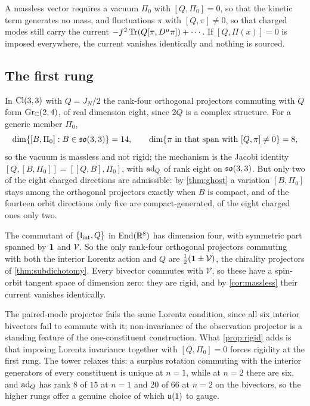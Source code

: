 \begin{corollary}
\label{cor:massless}
A massless vector requires a vacuum $\Pi_0$ with $[Q,\Pi_0]=0$, so that the kinetic term generates no mass, and fluctuations $\pi$ with $[Q,\pi]\neq0$, so that charged modes
still carry the current $-f^2\operatorname{Tr}(Q[\pi,D^\mu\pi])+\cdots$. If $[Q,\Pi(x)]=0$ is imposed everywhere, the current vanishes identically and nothing is sourced.
\end{corollary}

\subsection{The first rung}

\begin{theorem}
\label{thm:massless1}
In $\mathrm{Cl}(3,3)$ with $Q=J_N/2$ the rank-four orthogonal projectors commuting with $Q$ form $\mathrm{Gr}_{\mathbb{C}}(2,4)$, of real dimension eight, since $2Q$ is a complex structure.
For a generic member $\Pi_0$,
\[
\dim\{[B,\Pi_0]:B\in\mathfrak{so}(3,3)\}=14,\qquad \dim\{\pi\ \text{in that span with}\ [Q,\pi]\neq0\}=8,
\]
so the vacuum is massless and not rigid; the mechanism is the Jacobi identity $[Q,[B,\Pi_0]]=[[Q,B],\Pi_0]$, with $\operatorname{ad}_Q$ of rank eight on $\mathfrak{so}(3,3)$. But only two of the eight
charged directions are admissible: by \cref{thm:ghost} a variation $[B,\Pi_0]$ stays among the orthogonal projectors exactly when $B$ is compact, and of the fourteen orbit
directions only five are compact-generated, of the eight charged ones only two.
\end{theorem}

\begin{proposition}
\label{prop:rigid}
The commutant of $\{\mathfrak l_{\rm int},Q\}$ in $\operatorname{End}(\mathbb{R}^8)$ has dimension four, with symmetric part spanned by $\mathbf 1$ and $\mathcal V$. So the only rank-four orthogonal projectors commuting
with both the interior Lorentz action and $Q$ are $\tfrac12(\mathbf 1\pm\mathcal V)$, the chirality projectors of \cref{thm:subdichotomy}. Every bivector commutes with $\mathcal V$, so
these have a spin-orbit tangent space of dimension zero: they are rigid, and by \cref{cor:massless} their current vanishes identically.
\end{proposition}

The paired-mode projector fails the same Lorentz condition, since all six interior bivectors fail to commute with it; non-invariance of the observation projector
is a standing feature of the one-constituent construction. What \cref{prop:rigid} adds is that imposing Lorentz invariance together with $[Q,\Pi_0]=0$ forces rigidity
at the first rung. The tower relaxes this: a surplus rotation commuting with the interior generators of every constituent is unique at $n=1$, while at $n=2$ there are
six, and $\operatorname{ad}_Q$ has rank $8$ of $15$ at $n=1$ and $20$ of $66$ at $n=2$ on the bivectors, so the higher rungs offer a genuine choice of which $\mathfrak{u}(1)$ to gauge.

